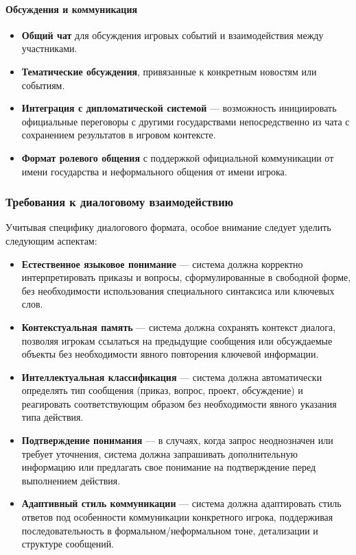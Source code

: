 \paragraph{Обсуждения и коммуникация}

\begin{itemize}
    \item \textbf{Общий чат} для обсуждения игровых событий и взаимодействия между участниками.

    \item \textbf{Тематические обсуждения}, привязанные к конкретным новостям или событиям.

    \item \textbf{Интеграция с дипломатической системой} — возможность инициировать официальные переговоры с другими государствами непосредственно из чата с сохранением результатов в игровом контексте.

    \item \textbf{Формат ролевого общения} с поддержкой официальной коммуникации от имени государства и неформального общения от имени игрока.
\end{itemize}

\subsubsection{Требования к диалоговому взаимодействию}

Учитывая специфику диалогового формата, особое внимание следует уделить следующим аспектам:

\begin{itemize}
    \item \textbf{Естественное языковое понимание} — система должна корректно интерпретировать приказы и вопросы, сформулированные в свободной форме, без необходимости использования специального синтаксиса или ключевых слов.

    \item \textbf{Контекстуальная память} — система должна сохранять контекст диалога, позволяя игрокам ссылаться на предыдущие сообщения или обсуждаемые объекты без необходимости явного повторения ключевой информации.

    \item \textbf{Интеллектуальная классификация} — система должна автоматически определять тип сообщения (приказ, вопрос, проект, обсуждение) и реагировать соответствующим образом без необходимости явного указания типа действия.

    \item \textbf{Подтверждение понимания} — в случаях, когда запрос неоднозначен или требует уточнения, система должна запрашивать дополнительную информацию или предлагать свое понимание на подтверждение перед выполнением действия.

    \item \textbf{Адаптивный стиль коммуникации} — система должна адаптировать стиль ответов под особенности коммуникации конкретного игрока, поддерживая последовательность в формальном/неформальном тоне, детализации и структуре сообщений.
\end{itemize}

